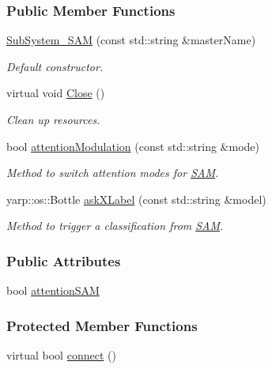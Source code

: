 \subsubsection*{Public Member Functions}
\begin{DoxyCompactItemize}
\item 
\hyperlink{group__icubclient__subsystems_a5ae7520f8397b1ff4e0018a46e6063fb}{Sub\+System\+\_\+\+S\+AM} (const std\+::string \&master\+Name)
\begin{DoxyCompactList}\small\item\em Default constructor. \end{DoxyCompactList}\item 
virtual void \hyperlink{group__icubclient__subsystems_a75b9591c2bbd9c20f1cd222d538c8c45}{Close} ()
\begin{DoxyCompactList}\small\item\em Clean up resources. \end{DoxyCompactList}\item 
bool \hyperlink{group__icubclient__subsystems_af5822eedc93b555f6004b61e6325e219}{attention\+Modulation} (const std\+::string \&mode)
\begin{DoxyCompactList}\small\item\em Method to switch attention modes for \hyperlink{namespaceSAM}{S\+AM}. \end{DoxyCompactList}\item 
yarp\+::os\+::\+Bottle \hyperlink{group__icubclient__subsystems_a3191f11027b606edbeaa876606e7cfac}{ask\+X\+Label} (const std\+::string \&model)
\begin{DoxyCompactList}\small\item\em Method to trigger a classification from \hyperlink{namespaceSAM}{S\+AM}. \end{DoxyCompactList}\end{DoxyCompactItemize}
\subsubsection*{Public Attributes}
\begin{DoxyCompactItemize}
\item 
bool \hyperlink{group__icubclient__subsystems_a8caf6370a0094554bf67793add9ca565}{attention\+S\+AM}
\end{DoxyCompactItemize}
\subsubsection*{Protected Member Functions}
\begin{DoxyCompactItemize}
\item 
virtual bool \hyperlink{group__icubclient__subsystems_ac92b15f98651868bc31dbf4688d50e74}{connect} ()
\end{DoxyCompactItemize}
